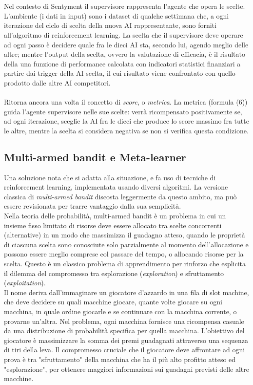 \documentclass[a4paper,12pt]{report}
\begin{document}
\begin{fig}
\\~\\Nel contesto di Sentyment il supervisore rappresenta l'agente che opera le scelte. L'ambiente (i dati in input) sono i dataset di qualche settimana che, a ogni iterazione del ciclo di scelta della nuova AI rappresentante, sono forniti all'algoritmo di reinforcement learning. La scelta che il supervisore deve operare ad ogni passo è decidere quale fra le dieci AI sta, secondo lui, agendo meglio delle altre; mentre l'output della scelta, ovvero la valutazione di efficacia, è il risultato della una funzione di performance calcolata con indicatori statistici finanziari a partire dai trigger della AI scelta, il cui risultato viene confrontato con quello prodotto dalle altre AI competitori.\\~\\Ritorna ancora una volta il concetto di \textit{score}, o \textit{metrica}. La metrica (formula (6)) guida l'agente supervisore nelle sue scelte: verrà ricompensato positivamente se, ad ogni iterazione, sceglie la AI fra le dieci che produce lo score massimo fra tutte le altre, mentre la scelta si considera negativa se non si verifica questa condizione.

\subsection{Multi-armed bandit e Meta-learner}
Una soluzione nota che si adatta alla situazione, e fa uso di tecniche di reinforcement learning, implementata usando diversi algoritmi. La versione classica di \textit{multi-armed bandit} discosta leggermente da questo ambito, ma può essere revisionata per trarre vantaggio dalla sua semplicità.\cite{rl}\\ Nella teoria delle probabilità, multi-armed bandit è un problema in cui un insieme fisso limitato di risorse deve essere allocato tra scelte concorrenti (alternative) in un modo che massimizza il guadagno atteso, quando le proprietà di ciascuna scelta sono conosciute solo parzialmente al momento dell'allocazione e possono essere meglio comprese col passare del tempo, o allocando risorse per la scelta. Questo è un classico problema di apprendimento per rinforzo che esplicita il dilemma del compromesso tra esplorazione (\textit{exploration}) e sfruttamento (\textit{exploitation}).\\ Il nome deriva dall'immaginare un giocatore d'azzardo in una fila di slot machine, che deve decidere su quali macchine giocare, quante volte giocare su ogni macchina, in quale ordine giocarle e se continuare con la macchina corrente, o provarne un'altra. Nel problema, ogni macchina fornisce una ricompensa casuale da una distribuzione di probabilità specifica per quella macchina. L'obiettivo del giocatore è massimizzare la somma dei premi guadagnati attraverso una sequenza di tiri della leva. Il compromesso cruciale che il giocatore deve affrontare ad ogni prova è tra "sfruttamento" della macchina che ha il più alto profitto atteso ed "esplorazione", per ottenere maggiori informazioni sui guadagni previsti delle altre macchine.



\end{fig}
\end{document}
